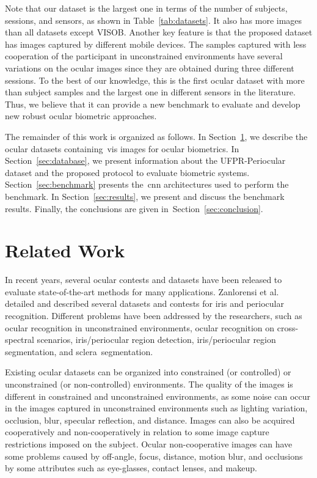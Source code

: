 \documentclass[journal]{IEEEtran}
\begin{document}
Note that our dataset is the largest one in terms of the number of subjects, sessions, and sensors, as shown in Table~\ref{tab:datasets}.
It also has more images than all datasets except VISOB.
Another key feature is that the proposed dataset has images captured by  different mobile devices.
The samples captured with less cooperation of the participant in unconstrained environments have several variations on the ocular images since they are obtained during three different sessions.
To the best of our knowledge, this is the first ocular dataset with more than  subject samples and the largest one in different sensors in the literature.
Thus, we believe that it can provide a new benchmark to evaluate and develop new robust ocular biometric approaches. 

The remainder of this work is organized as follows.
In Section~\ref{sec:related}, we describe the ocular datasets containing~\gls{vis} images for ocular biometrics.
In Section~\ref{sec:database}, we present information about the UFPR-Periocular dataset and the proposed protocol to evaluate biometric systems.
Section~\ref{sec:benchmark} presents the~\gls{cnn} architectures used to perform the  benchmark.
In Section~\ref{sec:results}, we present and discuss the benchmark results. 
Finally, the conclusions are given in~Section~\ref{sec:conclusion}.



 
\section{Related Work}
\label{sec:related}

In recent years, several ocular contests and datasets have been released to evaluate state-of-the-art methods for many applications.
Zanlorensi et al.~\cite{zanlorensi2019ocular} detailed and described several datasets and contests for iris and periocular recognition.
Different problems have been addressed by the researchers, such as ocular recognition in unconstrained environments, ocular recognition on cross-spectral scenarios, iris/periocular region detection, iris/periocular region segmentation, and sclera~segmentation.

Existing ocular datasets can be organized into constrained (or controlled) or unconstrained (or non-controlled) environments.
The quality of the images is different in constrained and unconstrained environments, as some noise can occur in the images captured in unconstrained environments such as lighting variation, occlusion, blur, specular reflection, and distance.
Images can also be acquired cooperatively and non-cooperatively in relation to some image capture restrictions imposed on the subject.
Ocular non-cooperative images can have some problems caused by off-angle, focus, distance, motion blur, and occlusions by some attributes such as eye-glasses, contact lenses, and makeup. 
\end{document}

